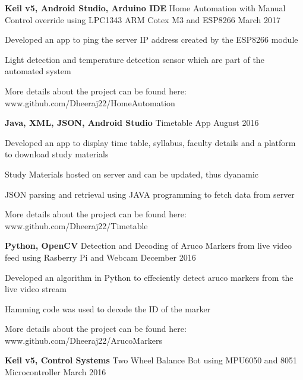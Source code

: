 \begin{cventries}
  \cventry
    {\textbf{Keil v5, Android Studio, Arduino IDE}}
    {Home Automation with Manual Control override using LPC1343 ARM Cotex M3 and ESP8266}
   {}
    {March 2017}
    {
      \begin{cvitems}
        \item {Developed an app to ping the server IP address created by the ESP8266 module}
         \item {Light detection and temperature detection sensor which are part of the automated system}
         \item {More details about the project can be found here: \textcolor{awesome-emerald}{www.github.com/Dheeraj22/HomeAutomation}}
      \end{cvitems}
    }
     \cventry
    {\textbf{Java, XML, JSON, Android Studio}}
    {Timetable App}
    {}
    {August 2016}
    {
      \begin{cvitems}
        \item {Developed an app to display time table, syllabus, faculty details and a platform to download study materials}
         \item {Study Materials hosted on server and can be updated, thus dyanamic}
         \item {JSON parsing and retrieval using JAVA programming to fetch data from server}
         \item {More details about the project can be found here: \textcolor{awesome-emerald}{www.github.com/Dheeraj22/Timetable}}
      \end{cvitems}
    }
    \cventry
    {\textbf{Python, OpenCV}}
    {Detection and Decoding of Aruco Markers from live video feed using Rasberry Pi and Webcam}
    {}
    {December 2016}
    {
      \begin{cvitems}
        \item {Developed an algorithm in Python to effeciently detect aruco markers from the live video stream}
         \item {Hamming code was used to decode the ID of the marker}
         \item {More details about the project can be found here: \textcolor{awesome-emerald}{www.github.com/Dheeraj22/ArucoMarkers}}
      \end{cvitems}
    }
     \cventry
    {\textbf{Keil v5, Control Systems}}
    {Two Wheel Balance Bot using MPU6050 and 8051 Microcontroller}
    {}
    {March 2016}
    {
      \begin{cvitems}

\end{cvitems}}
\end{cventries}
